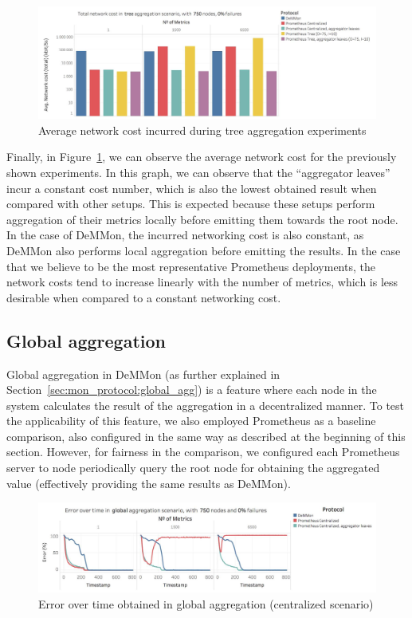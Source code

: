 \begin{figure}
    \centering
    \includegraphics[width=\linewidth]{Chapters/evaluation/figures/aggregation/network_cost_tree.jpg}
    \caption{Average network cost incurred during tree aggregation experiments}
    \label{fig:sec:mon_eval_tree_net_cost}
\end{figure}

Finally, in Figure~\ref{fig:sec:mon_eval_tree_net_cost}, we can observe the average network cost for the previously shown experiments. In this graph, we can observe that the ``aggregator leaves'' incur a constant cost number, which is also the lowest obtained result when compared with other setups. This is expected because these setups perform aggregation of their metrics locally before emitting them towards the root node. In the case of DeMMon, the incurred networking cost is also constant, as DeMMon also performs local aggregation before emitting the results. In the case that we believe to be the most representative Prometheus deployments, the network costs tend to increase linearly with the number of metrics, which is less desirable when compared to a constant networking cost.

\subsection{Global aggregation}

Global aggregation in DeMMon (as further explained in Section~\ref{sec:mon_protocol:global_agg}) is a feature where each node in the system calculates the result of the aggregation in a decentralized manner. To test the applicability of this feature, we also employed Prometheus as a baseline comparison, also configured in the same way as described at the beginning of this section. However, for fairness in the comparison, we configured each Prometheus server to node periodically query the root node for obtaining the aggregated value (effectively providing the same results as DeMMon).

\begin{figure}
    \centering
    \includegraphics[width=\linewidth]{Chapters/evaluation/figures/aggregation/Error_over_time_global_0_failures_centralized.jpg}
    \caption{Error over time obtained in global aggregation (centralized scenario)}
    \label{fig:sec:mon_eval_global_centralized}
\end{figure}

